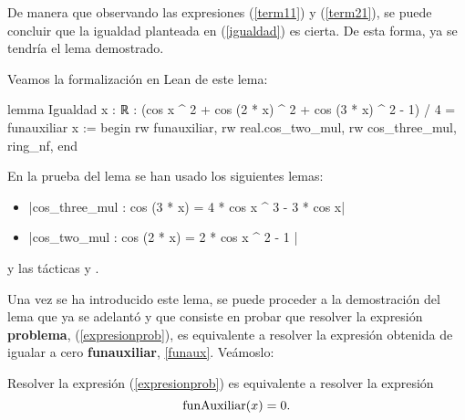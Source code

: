\begin{demostracion}
De manera que observando las expresiones (\ref{term11}) y
(\ref{term21}), se puede concluir que la igualdad planteada en
(\ref{igualdad}) es cierta.  De esta forma, ya se tendría el lema
demostrado.
\end{demostracion}

Veamos la formalización en Lean de este lema:
\begin{leancode}
lemma Igualdad {x : ℝ} :
  (cos x ^ 2 + cos (2 * x) ^ 2 + cos (3 * x) ^ 2 - 1) / 4 = funauxiliar x :=
begin
  rw funauxiliar,
  rw real.cos_two_mul,
  rw cos_three_mul,
  ring_nf,
end
\end{leancode}

En la prueba del lema se han usado los siguientes lemas:
\begin{itemize}
\item {}|cos_three_mul : cos (3 * x) = 4 * cos x ^ 3 - 3 * cos x|
\item {}|cos_two_mul : cos (2 * x) = 2 * cos x ^ 2 - 1 |
\end{itemize}
y las tácticas
 y
.

Una vez se ha introducido este lema, se puede proceder a la demostración
del lema que ya se adelantó y que consiste en probar que resolver la
expresión \textbf{problema}, (\ref{expresionprob}), es equivalente a
resolver la expresión obtenida de igualar a cero \textbf{funauxiliar},
\ref{funaux}. Veámoslo:

\begin{lema}[Equivalencia]\label{lemaequivalenciaprob}
  Resolver la expresión (\ref{expresionprob}) es equivalente a resolver
  la expresión
  \begin{equation}\label{probaux}
    \mbox{\rm funAuxiliar}(x) = 0.
  \end{equation}
\end{lema}

